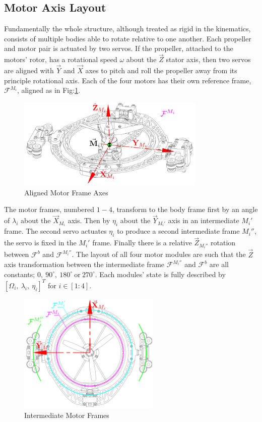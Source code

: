 \subsection{Motor Axis Layout}
\label{subsec:proto.conventions.motoraxis}
Fundamentally the whole structure, although treated as rigid in the kinematics, consists of multiple bodies able to rotate relative to one another. Each propeller and motor pair is actuated by two servos. If the propeller, attached to the motors' rotor, has a rotational speed $\omega$ about the $\vec{Z}$ stator axis, then two servos are aligned with $\vec{Y}$ and $\vec{X}$ axes to pitch and roll the propeller away from its principle rotational axis. Each of the four motors has their own reference frame, $\mathcal{F}^{M_i}$, aligned as in Fig:\ref{fig:motor-axes}.
\begin{figure}[htbp]
\centering
\includegraphics[width=0.8\textwidth]{figs/motor-axes}
\caption{Aligned Motor Frame Axes}
\label{fig:motor-axes}
\end{figure}
\par
The motor frames, numbered $1-4$, transform to the body frame first by an angle of $\lambda_i$ about the $\vec{X}_{M_i}$ axis. Then by $\eta_i$ about the $\vec{Y}_{M_i'}$ axis in an intermediate $M_i'$ frame. The second servo actuates $\eta_i$ to produce a second intermediate frame $M_i''$, the servo is fixed in the $M_i'$ frame. Finally there is a relative $\vec{Z}_{M_i''}$ rotation between $\mathcal{F}^b$ and $\mathcal{F}^{M_i''}$. The layout of all four motor modules are such that the $\vec{Z}$ axis transformation between the intermediate frame $\mathcal{F}^{M_i''}$ and $\mathcal{F}^b$ are all constants; $0,~90^{\circ},~180^{\circ}~\text{or}~270^{\circ}$. Each modules' state is fully described by $[\Omega_{i},~\lambda_{i},~\eta_{i}]^{T}$ for $i\in [1:4]$.
\begin{figure}[hbtp]
\centering
\includegraphics[width=0.6\textwidth]{figs/motor-frame}
\caption{Intermediate Motor Frames}
\label{fig:motor-frame}
\end{figure}
